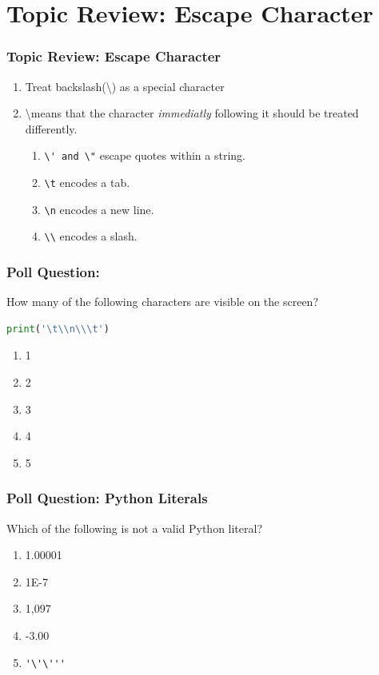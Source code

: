 \documentclass{beamer}
\begin{document}
\section{Topic Review: Escape Character}
\begin{frame}[fragile]
  \frametitle{Topic Review: Escape Character}
  \begin{enumerate}
    \item Treat backslash(\textbackslash) as a special character
    \item \textbackslash means that the character \textit{immediatly} following it should be treated differently.
      \begin{enumerate}
        \item \lstinline{\' and \"} escape quotes within a string.
        \item \lstinline{\t} encodes a tab.
        \item \lstinline{\n} encodes a new line.
        \item \lstinline{\\} encodes a slash.
      \end{enumerate}
  \end{enumerate}
\end{frame}

%
%
%
\begin{frame}[fragile]
  \frametitle{Poll Question: }
  How many of the following characters are visible on the screen?\\
  \begin{lstlisting}[language=Python]
  print('\t\\n\\\t')
  \end{lstlisting}
  \vfill
  \begin{minipage}{.48\textwidth}
    \begin{enumerate}
      \item 1
      \item 2
      \item 3
      \item 4
      \item 5
    \end{enumerate}
  \end{minipage}
  \begin{minipage}{.48\textwidth}
  \end{minipage}
\end{frame}

%
%
%
\begin{frame}[fragile]
  \frametitle{Poll Question: Python Literals}
  Which of the following is not a valid Python literal?
  \begin{enumerate}
    \item 1.00001
    \item 1E-7
    \item 1,097
    \item -3.00
    \item \lstinline{'\'\'''}
  \end{enumerate}
\end{frame}
\end{document}
